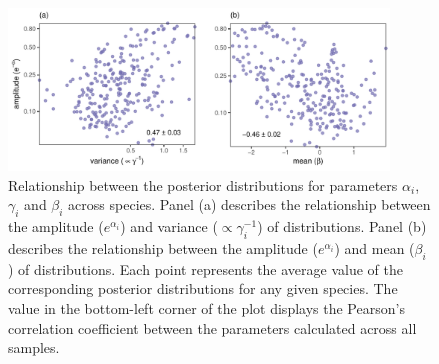 \documentclass[11pt, a4paper]{article}
\begin{document}
\begin{figure}[ht]
  \centering
    \vspace{0.5cm}
    \includegraphics[width=0.9\textwidth]{figures/alpha-vs-gamma-beta}
    	  \vspace{0.3cm}
	   \caption{Relationship between the posterior distributions for parameters $\alpha_i$, $\gamma_i$ and $\beta_i$ across species. Panel (a) describes the relationship between the amplitude ($e^{\alpha_i}$) and variance ($\propto\gamma_i^{-1}$) of distributions. Panel (b) describes the relationship between the amplitude ($e^{\alpha_i}$) and mean ($\beta_i$) of distributions. Each point represents the average value of the corresponding posterior distributions for any given species. The value in the bottom-left corner of the plot displays the Pearson's correlation coefficient between the parameters calculated across all samples.}
      \label{sfig:alpha-vs-gammabeta}
\end{figure}

\clearpage
\end{document}
